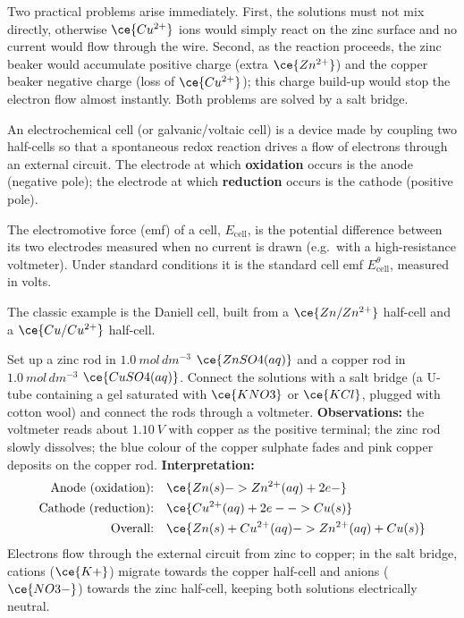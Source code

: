 \documentclass[11pt]{article}
\newcommand{\cle}[1]{{\popxbold\color{popdark}#1}}
\newcounter{popsec}
\newcounter{popsub}
\newcommand{\courssub}[1]{%
  \stepcounter{popsub}%
  \par\vspace{9pt}\noindent{\popxbold\fontsize{11.5}{13}\selectfont\color{popink}{\color{poporange}\thepopsec.\thepopsub}\hspace{6pt}#1}\par\nopagebreak\vspace{4pt}
}
\begin{document}
Two practical problems arise immediately. First, the solutions must not mix directly, otherwise $\ce{Cu^{2+}}$ ions would simply react on the zinc surface and no current would flow through the wire. Second, as the reaction proceeds, the zinc beaker would accumulate positive charge (extra $\ce{Zn^{2+}}$) and the copper beaker negative charge (loss of $\ce{Cu^{2+}}$); this charge build-up would stop the electron flow almost instantly. Both problems are solved by a \cle{salt bridge}.

\begin{definition}
An \cle{electrochemical cell} (or galvanic/voltaic cell) is a device made by coupling two half-cells so that a spontaneous redox reaction drives a flow of electrons through an external circuit. The electrode at which \textbf{oxidation} occurs is the \cle{anode} (negative pole); the electrode at which \textbf{reduction} occurs is the \cle{cathode} (positive pole).
\end{definition}

\begin{definition}
The \cle{electromotive force} (emf) of a cell, $E_{\text{cell}}$, is the potential difference between its two electrodes measured when no current is drawn (e.g.\ with a high-resistance voltmeter). Under standard conditions it is the \cle{standard cell emf} $E^\theta_{\text{cell}}$, measured in volts.
\end{definition}

\courssub{The Daniell Cell}

The classic example is the \cle{Daniell cell}, built from a $\ce{Zn/Zn^{2+}}$ half-cell and a $\ce{Cu/Cu^{2+}}$ half-cell.

\begin{experience}
Set up a zinc rod in $\SI{1.0}{mol\,dm^{-3}}$ $\ce{ZnSO4(aq)}$ and a copper rod in $\SI{1.0}{mol\,dm^{-3}}$ $\ce{CuSO4(aq)}$. Connect the solutions with a salt bridge (a U-tube containing a gel saturated with $\ce{KNO3}$ or $\ce{KCl}$, plugged with cotton wool) and connect the rods through a voltmeter.
\textbf{Observations:} the voltmeter reads about $\SI{1.10}{V}$ with copper as the positive terminal; the zinc rod slowly dissolves; the blue colour of the copper sulphate fades and pink copper deposits on the copper rod.
\textbf{Interpretation:}
\begin{align*}
\text{Anode (oxidation):}\quad & \ce{Zn(s) -> Zn^{2+}(aq) + 2e-}\\
\text{Cathode (reduction):}\quad & \ce{Cu^{2+}(aq) + 2e- -> Cu(s)}\\
\text{Overall:}\quad & \ce{Zn(s) + Cu^{2+}(aq) -> Zn^{2+}(aq) + Cu(s)}
\end{align*}
Electrons flow through the external circuit from zinc to copper; in the salt bridge, cations ($\ce{K+}$) migrate towards the copper half-cell and anions ($\ce{NO3-}$) towards the zinc half-cell, keeping both solutions electrically neutral.
\end{experience}
\end{document}
